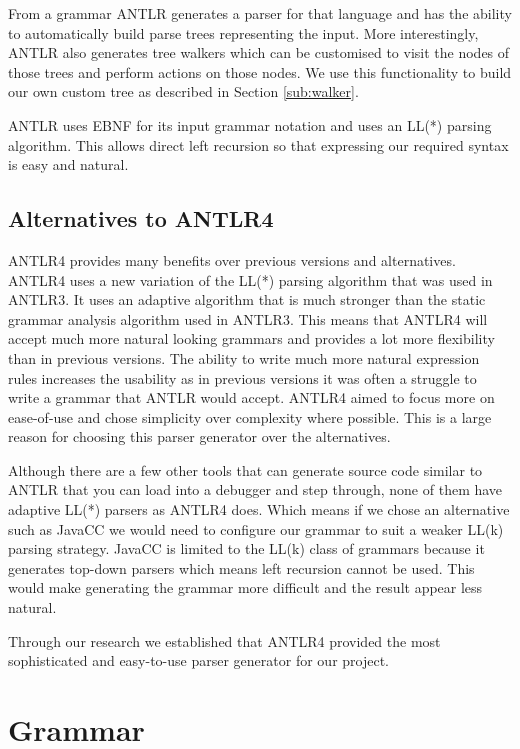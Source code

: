 \documentclass{report}
\begin{document}
From a grammar ANTLR generates a parser for that language and has the ability to automatically build parse trees representing the input. More interestingly, ANTLR also generates tree walkers which can be customised to visit the nodes of those trees and perform actions on those nodes. We use this functionality to build our own custom tree as described in Section \ref{sub:walker}.

ANTLR uses EBNF for its input grammar notation and uses an LL(*) parsing algorithm. This allows direct left recursion so that expressing our required syntax is easy and natural. 

\subsection{Alternatives to ANTLR4}
\label{sub:alternatives_to_antlr4}

ANTLR4 provides many benefits over previous versions and alternatives. ANTLR4 uses a new variation of the LL(*) parsing algorithm that was used in ANTLR3. It uses an adaptive algorithm that is much stronger than the static grammar analysis algorithm used in ANTLR3. This means that ANTLR4 will accept much more natural looking grammars and provides a lot more flexibility than in previous versions. The ability to write much more natural expression rules increases the usability as in previous versions it was often a struggle to write a grammar that ANTLR would accept. ANTLR4 aimed to focus more on ease-of-use and chose simplicity over complexity where possible. This is a large reason for choosing this parser generator over the alternatives.

Although there are a few other tools that can generate source code similar to ANTLR that you can load into a debugger and step through, none of them have adaptive LL(*) parsers as ANTLR4 does. Which means if we chose an alternative such as JavaCC we would need to configure our grammar to suit a weaker LL(k) parsing strategy. JavaCC is limited to the LL(k) class of grammars because it generates top-down parsers which means left recursion cannot be used. This would make generating the grammar more difficult and the result appear less natural.

Through our research we established that ANTLR4 provided the most sophisticated and easy-to-use parser generator for our project.

\section{Grammar}
\end{document}
